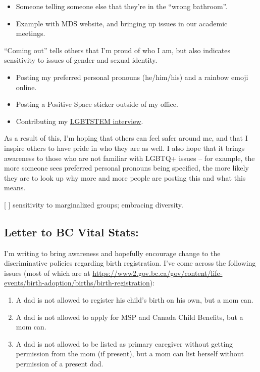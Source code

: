 \documentclass[]{article}
\providecommand{\tightlist}{%
  \setlength{\itemsep}{0pt}\setlength{\parskip}{0pt}}
\begin{document}
\begin{itemize}
\tightlist
\item
  Someone telling someone else that they're in the ``wrong bathroom''.
\item
  Example with MDS website, and bringing up issues in our academic meetings.
\end{itemize}

``Coming out'' tells others that I'm proud of who I am, but also indicates sensitivity to issues of gender and sexual identity.

\begin{itemize}
\tightlist
\item
  Posting my preferred personal pronouns (he/him/his) and a rainbow emoji online.
\item
  Posting a Positive Space sticker outside of my office.
\item
  Contributing my \href{https://lgbtstem.wordpress.com/2019/11/09/an-interview-with-vincenzo-coia/}{LGBTSTEM interview}.
\end{itemize}

As a result of this, I'm hoping that others can feel safer around me, and that I inspire others to have pride in who they are as well. I also hope that it brings awareness to those who are not familiar with LGBTQ+ issues -- for example, the more someone sees preferred personal pronouns being specified, the more likely they are to look up why more and more people are posting this and what this means.

{[} {]} sensitivity to marginalized groups; embracing diversity.

\hypertarget{letter-to-bc-vital-stats}{%
\subsection{Letter to BC Vital Stats:}\label{letter-to-bc-vital-stats}}

I'm writing to bring awareness and hopefully encourage change to the discriminative policies regarding birth registration. I've come across the following issues (most of which are at \url{https://www2.gov.bc.ca/gov/content/life-events/birth-adoption/births/birth-registration}):

\begin{enumerate}
\def\labelenumi{\arabic{enumi}.}
\tightlist
\item
  A dad is not allowed to register his child's birth on his own, but a mom can.
\item
  A dad is not allowed to apply for MSP and Canada Child Benefits, but a mom can.
\item
  A dad is not allowed to be listed as primary caregiver without getting permission from the mom (if present), but a mom can list herself without permission of a present dad.
\end{enumerate}
\end{document}
